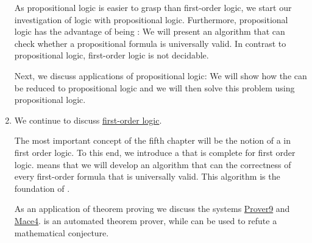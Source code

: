 \begin{enumerate}
      As propositional logic is easier to grasp than first-order logic, we start our investigation
      of logic with propositional logic.  Furthermore, propositional logic has the advantage of
      being :  We will present an algorithm that can check whether a propositional formula
      is universally valid.  In contrast to propositional logic, first-order logic is not decidable.

      Next, we discuss applications of propositional logic:  We will show how the  
      can be reduced to propositional logic and we will then solve this problem using propositional logic.
\item We continue to discuss \href{https://en.wikipedia.org/wiki/First-order_logic}{first-order logic}.

      The most important concept of the fifth chapter will be the notion of a  in
      first order logic.  To this end, we introduce a  that is
      \colorbox{amethyst}{complete} for first order logic.   means that we will develop an
      algorithm that can  the correctness of every first-order formula that is
      universally valid.  This algorithm is the foundation of .

      As an application of theorem proving we discuss the systems \href{https://www.cs.unm.edu/~mccune/mace4/}{Prover9} and
      \href{https://www.cs.unm.edu/~mccune/mace4/}{Mace4}.  is an automated theorem prover, while
       can be used to refute a mathematical conjecture.
\end{enumerate}

